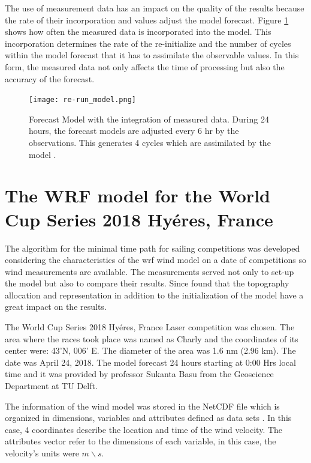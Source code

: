 The use of measurement data has an impact on the quality of the results because the rate of their incorporation and values adjust the model forecast. Figure \ref{fig:data_meas_integration} shows how often the measured data is incorporated into the model. This incorporation determines the rate of the re-initialize and the number of cycles within the model forecast that it has to assimilate the observable values. In this form, the measured data not only affects the time of processing but also the accuracy of the forecast. \par

\begin{figure}
    \centering
    \texttt{[image: re-run\_model.png]}
    \caption{Forecast Model with the integration of measured data. During 24 hours, the forecast models are adjusted every 6 hr by the observations. This generates 4 cycles which are assimilated by the model \cite{warner2010numerical}. }
    \label{fig:data_meas_integration}
\end{figure}

\section{The WRF model for the World Cup Series 2018 Hyéres, France}

The algorithm for the minimal time path for sailing competitions was developed considering the characteristics of the \acrshort{wrf} wind model on a date of competitions so wind measurements are available. The measurements served not only to set-up the model but also to compare their results. Since \cite{giannaros2018ultrahigh} found that the topography allocation and representation in addition to the initialization of the model have a great impact on the results. \par

The World Cup Series 2018 Hyéres, France Laser competition was chosen. The area where the races took place was named as Charly and the coordinates of its center were: 43'N, 006' E. The diameter of the area was 1.6 nm (2.96 km). The date was April 24, 2018. The model forecast 24 hours starting at 0:00 Hrs local time and it was provided by professor Sukanta Basu from the Geoscience Department at TU Delft. \par 

The information of the wind model was stored in the NetCDF file which is organized in dimensions, variables and attributes defined as data sets \cite{netcdf56302}. In this case, 4 coordinates describe the location and time of the wind velocity. The attributes vector refer to the dimensions of each variable, in this case, the velocity's units were $m \backslash s $. \par 

